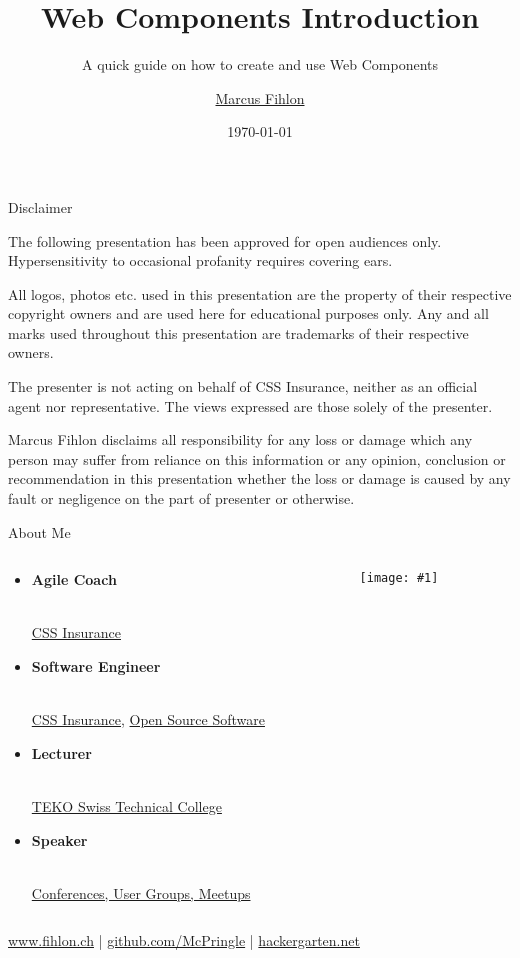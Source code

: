 \documentclass{beamer}
\title{Web Components Introduction}
\subtitle{A quick guide on how to create and use Web Components}
\author{\href{https://www.fihlon.ch/}{Marcus Fihlon}}
\institute[Fihlon]{\href{https://www.fihlon.ch/}{Agile Coach | Software Engineer | Lecturer | Speaker}}
\date{\today}
\newcommand{\myfig}[2]{
	\begin{minipage}[c]{\textwidth}
		\begin{center}
			\texttt{[image: \#1]}
		\end{center}
		\vspace{3mm}
	\end{minipage}
}
\newcommand{\bb}[1]{\textbf{#1}}
\newcommand{\slideItems}[1]{
	\begin{itemize}
		#1
	\end{itemize}
}
\newcommand{\slide}[2]{
	\begin{frame}{#1}
		#2
	\end{frame}
}
\begin{document}
\maketitle
\newlength\someheight

\slide{Disclaimer}{
	\begin{small}
		The following presentation has been approved for open audiences only. Hypersensitivity to occasional profanity requires covering ears.
		
		All logos, photos etc. used in this presentation are the property of their respective copyright owners and are used here for educational purposes only. Any and all marks used throughout this presentation are trademarks of their respective owners.
		
		The presenter is not acting on behalf of CSS Insurance, neither as an official agent nor representative. The views expressed are those solely of the presenter.
		
		Marcus Fihlon disclaims all responsibility for any loss or damage which any person may suffer from reliance on this information or any opinion, conclusion or recommendation in this presentation whether the loss or damage is caused by any fault or negligence on the part of presenter or otherwise.
	\end{small}
}

\slide{About Me}{
	\begin{columns}
    	\begin{column}{5cm}
			\begin{tiny}
				\slideItems{
					\setlength{\itemsep}{12pt}
					\item
						\begin{normalsize}\bb{Agile Coach}\end{normalsize} \\
						\href{https://www.css.ch/}{CSS Insurance}
					\item
						\begin{normalsize}\bb{Software Engineer}\end{normalsize} \\
						\href{https://www.css.ch/}{CSS Insurance},
						\href{https://github.com/McPringle}{Open Source Software}
					\item
						\begin{normalsize}\bb{Lecturer}\end{normalsize} \\
						\href{http://www.teko.ch/}{TEKO Swiss Technical College}
					\item
						\begin{normalsize}\bb{Speaker}\end{normalsize} \\
						\href{https://www.fihlon.ch/}{Conferences, User Groups, Meetups}
				}
			\end{tiny}
    	\end{column}
	    \begin{column}{5cm}
        	\myfig{McPringle}{0.8}
    	\end{column}
	\end{columns}
	\href{https://www.fihlon.ch}{www.fihlon.ch} |
	\href{https://github.com/McPringle}{github.com/McPringle} |
	\href{http://hackergarten.net}{hackergarten.net}
}
\end{document}
